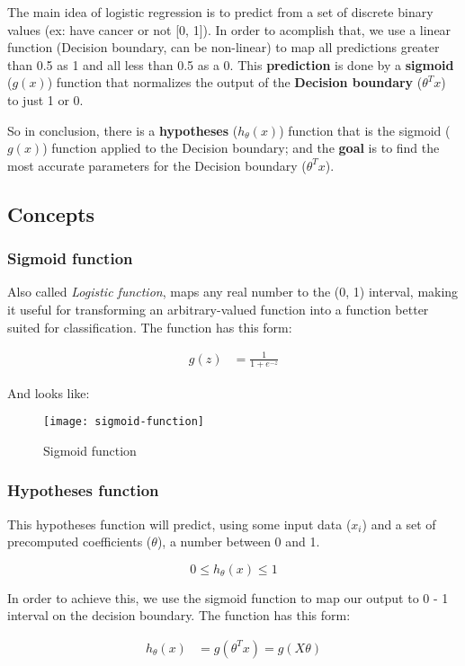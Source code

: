 The main idea of logistic regression is to predict from a set of discrete binary values (ex: have cancer or not [0, 1]). In order to acomplish that, we use a linear function (Decision boundary, can be non-linear) to map all predictions greater than 0.5 as 1 and all less than 0.5 as a 0. This \textbf{prediction} is done by a \textbf{sigmoid} ($g(x)$) function that normalizes the output of the \textbf{Decision boundary} ($\theta^Tx$) to just 1 or 0.

So in conclusion, there is a \textbf{hypotheses} ($h_{\theta}(x)$) function that is the sigmoid ($g(x)$) function applied to the Decision boundary; and the \textbf{goal} is to find the most accurate parameters for the Decision boundary ($\theta^Tx$).

\subsection{Concepts}
\subsubsection{Sigmoid function}
Also called \textit{Logistic function}, maps any real number to the (0, 1) interval, making it useful for transforming an arbitrary-valued function into a function better suited for classification. The function has this form:

\begin{align}
	g(z) & = \frac{1}{1 + e^{-z}}
\end{align}

And looks like:
\begin{figure}[h]
    \centering
    \texttt{[image: sigmoid-function]}
    \caption{Sigmoid function}
    \label{fig:sigmoid}
\end{figure}

\subsubsection{Hypotheses function}
This hypotheses function will predict, using some input data ($x_i$) and a set of precomputed coefficients ($\theta$), a number between 0 and 1.

$$0 \le h_{\theta}(x) \le 1$$

In order to achieve this, we use the sigmoid function to map our output to 0 - 1 interval on the decision boundary. The function has this form:

\begin{align}
	h_{\theta}(x) & = g(\theta^Tx) = g(X\theta)
\end{align}

